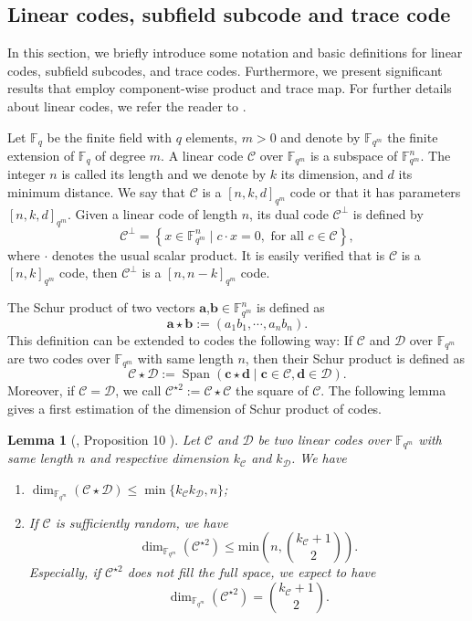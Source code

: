 \documentclass[a4paper]{article}
\newtheorem{lemma}[thm]{Lemma}
\theoremstyle{definition}
\theoremstyle{remark}
\newcommand{\calC}{\mathcal{C}}
\newcommand{\calD}{\mathcal{D}}
\newcommand{\fqm}{\mathbb{F}_{q^m}}
\newcommand{\fq}{\mathbb{F}_{q}}
\newcommand{\Span}[1]{\operatorname{Span}\left(#1\right)}
\newcommand\TODO[1]{\textcolor{red}{TO DO: #1}}
\begin{document}
\subsection{Linear codes, subfield subcode and trace code}


In this section, we briefly introduce some notation and basic definitions for linear codes, subfield subcodes, and trace codes. Furthermore, we present significant results that employ component-wise product and trace map. For further details about linear codes, we refer the reader to \cite{MS86}.

\noindent Let $\fq$ be the finite field with $q$ elements, $m > 0$ and denote  by $\fqm$ the finite extension of $\fq$ of degree $m$. A linear code $\calC$ over $\fqm$ is a subspace of $\fqm^n$. The integer $n$ is called its length and we denote by $k$ its dimension, and $d$ its minimum distance. We say that $\calC$ is a $[n,k,d]_{q^m}$ code or that it has parameters $[n,k,d]_{q^m}$. Given a linear code of length $n$, its dual code $\calC^{\perp}$ is defined by 
\[\calC^{\perp}=\left\lbrace x \in \fqm^n \mid c \cdot x=0, \text{ for all } c \in \calC \right\rbrace,\]  
where $\cdot$ denotes the usual scalar product. It is easily verified that is $\calC$ is a $[n,k]_{q^m}$ code, then $\calC^{\perp}$ is a $[n,n-k]_{q^m}$ code.

\noindent The Schur product of two vectors $\mathbf{a}$,$\mathbf{b} \in \fqm^n$ is defined as 
\[ \mathbf{a} \star \mathbf{b} := (a_1b_1,\cdots,a_nb_n). \]
This definition can be extended to codes the following way: If $\calC$ and $\calD$ over $\fqm$ are two codes over $\fqm$ with same length $n$, then their Schur product is defined as
\[ \calC \star \calD := \Span{\mathbf{c} \star \mathbf{d} \mid \mathbf{c} \in \calC, \mathbf{d} \in \calD}. \]
Moreover, if $\calC = \calD$, we call $\calC^{\star 2} := \calC \star \calC$ the square of $\calC$. The following lemma gives a first estimation of the dimension of Schur product of codes.

\begin{lemma}[\cite{MT21}, Proposition 10 ] \label{lem:known_bounds}
Let $\calC$ and $\calD$ be two linear codes over $\fqm$ with same length $n$ and respective dimension $k_{\calC}$ and $k_{\calD}$. We have
\begin{enumerate}
	\item $\dim_{\fqm}(\calC \star \calD) \leq \min\{k_{\calC}k_{\calD},n\}$;
	\item If $\calC$ is sufficiently random, we have
\[ \dim_{\mathbb{F}_{q^m}}(\calC^{\star2}) \leq \mathrm{min}\left(n,\binom{k_{\calC}+1}{2}\right) . \]
Especially, if $\calC^{\star2}$ does not fill the full space, we expect to have 
	\[ \dim_{\fqm}(\calC^{\star2}) = \binom{k_{\calC}+1}{2}.\]
	\end{enumerate}
\end{lemma}
\end{document}

